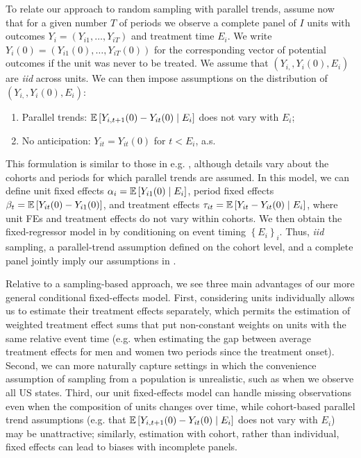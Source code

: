\documentclass[english,11pt]{article}
\theoremstyle{plain}
\theoremstyle{plain}
\theoremstyle{plain}
\theoremstyle{plain}
\let\ref\Cref
\begin{document}
To relate our approach to random sampling with parallel trends, assume
now that for a given number $T$ of periods we observe a complete
panel of $I$ units with outcomes $Y_{i}=(Y_{i1},\ldots,Y_{iT})$
and treatment time $E_{i}$. We write $Y_{i}(0)=(Y_{i1}(0),\ldots,Y_{iT}(0))$
for the corresponding vector of potential outcomes if the unit was
never to be treated. We assume that $(Y_{i,},Y_{i}(0),E_{i})$ are
\emph{iid }across units. We can then impose assumptions on the distribution
of $(Y_{i,},Y_{i}(0),E_{i})$:
\begin{enumerate}
\item Parallel trends: $\mathbb{E}\left[Y_{i,t+1}(0)-Y_{it}(0)\mid E_{i}\right]$ does
not vary with $E_{i}$;
\item No anticipation: $Y_{it}=Y_{it}(0)$ for $t<E_{i}$, a.s.
\end{enumerate}
This formulation is similar to those in e.g. \textcite{DeChaisemartin2018,Abraham2018,Callaway2018},
although details vary about the cohorts and periods for which parallel
trends are assumed. In this model, we can define unit fixed effects
$\alpha_{i}=\mathbb{E}\left[Y_{i1}(0)\mid E_{i}\right]$, period fixed effects $\beta_{t}=\mathbb{E}\left[Y_{it}(0)-Y_{i1}(0)\right]$,
and treatment effects $\tau_{it}=\mathbb{E}\left[Y_{it}-Y_{it}(0)\mid E_{i}\right]$,
where unit FEs and treatment effects do not vary within cohorts. We
then obtain the fixed-regressor model in \ref{sec:Setting} by conditioning
on event timing $\left\{ E_{i}\right\} _{i}$. Thus, \emph{iid} sampling,
a parallel-trend assumption defined on the cohort level, and a complete
panel jointly imply our assumptions in \ref{sec:Setting}.

Relative to a sampling-based approach, we see three main advantages
of our more general conditional fixed-effects model. First, considering
units individually allows us to estimate their treatment effects separately,
which permits the estimation of weighted treatment effect sums that
put non-constant weights on units with the same relative event time
(e.g. when estimating the gap between average treatment effects for
men and women two periods since the treatment onset). Second, we can
more naturally capture settings in which the convenience assumption
of sampling from a population is unrealistic, such as when we observe
all US states. Third, our unit fixed-effects model can handle missing
observations even when the composition of units changes over time,
while cohort-based parallel trend assumptions (e.g. that $\mathbb{E}\left[Y_{i,t+1}(0)-Y_{it}(0)\mid E_{i}\right]$
does not vary with $E_{i}$) may be unattractive; similarly, estimation
with cohort, rather than individual, fixed effects can lead to biases
with incomplete panels.
\end{document}
